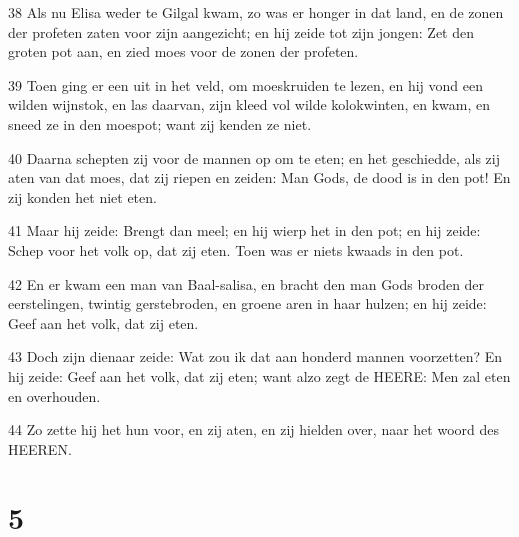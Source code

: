 \par 38 Als nu Elisa weder te Gilgal kwam, zo was er honger in dat land, en de zonen der profeten zaten voor zijn aangezicht; en hij zeide tot zijn jongen: Zet den groten pot aan, en zied moes voor de zonen der profeten.
\par 39 Toen ging er een uit in het veld, om moeskruiden te lezen, en hij vond een wilden wijnstok, en las daarvan, zijn kleed vol wilde kolokwinten, en kwam, en sneed ze in den moespot; want zij kenden ze niet.
\par 40 Daarna schepten zij voor de mannen op om te eten; en het geschiedde, als zij aten van dat moes, dat zij riepen en zeiden: Man Gods, de dood is in den pot! En zij konden het niet eten.
\par 41 Maar hij zeide: Brengt dan meel; en hij wierp het in den pot; en hij zeide: Schep voor het volk op, dat zij eten. Toen was er niets kwaads in den pot.
\par 42 En er kwam een man van Baal-salisa, en bracht den man Gods broden der eerstelingen, twintig gerstebroden, en groene aren in haar hulzen; en hij zeide: Geef aan het volk, dat zij eten.
\par 43 Doch zijn dienaar zeide: Wat zou ik dat aan honderd mannen voorzetten? En hij zeide: Geef aan het volk, dat zij eten; want alzo zegt de HEERE: Men zal eten en overhouden.
\par 44 Zo zette hij het hun voor, en zij aten, en zij hielden over, naar het woord des HEEREN.

\chapter{5}

